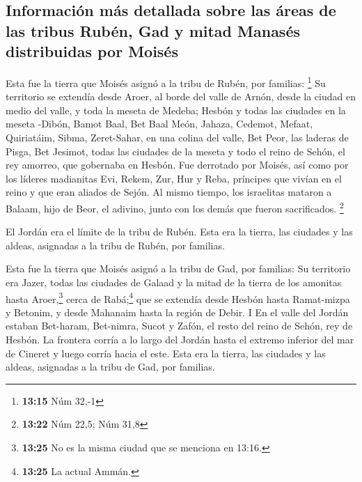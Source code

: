 \hypertarget{informaciuxf3n-muxe1s-detallada-sobre-las-uxe1reas-de-las-tribus-rubuxe9n-gad-y-mitad-manasuxe9s-distribuidas-por-moisuxe9s}{%
\subsection{Información más detallada sobre las áreas de las tribus
Rubén, Gad y mitad Manasés distribuidas por
Moisés}\label{informaciuxf3n-muxe1s-detallada-sobre-las-uxe1reas-de-las-tribus-rubuxe9n-gad-y-mitad-manasuxe9s-distribuidas-por-moisuxe9s}}

 Esta fue la tierra que Moisés asignó a la tribu de
Rubén, por familias: \footnote{\textbf{13:15} Núm 32,-1} 
Su territorio se extendía desde Aroer, al borde del valle de Arnón,
desde la ciudad en medio del valle, y toda la meseta de Medeba;
 Hesbón y todas las ciudades en la meseta -Dibón, Bamot
Baal, Bet Baal Meón,  Jahaza, Cedemot, Mefaat,
 Quiriatáim, Sibma, Zeret-Sahar, en una colina del valle,
 Bet Peor, las laderas de Pisga, Bet Jesimot,
 todas las ciudades de la meseta y todo el reino de
Sehón, el rey amorreo, que gobernaba en Hesbón. Fue derrotado por
Moisés, así como por los líderes madianitas Evi, Rekem, Zur, Hur y Reba,
príncipes que vivían en el reino y que eran aliados de Sejón.
 Al mismo tiempo, los israelitas mataron a Balaam, hijo
de Beor, el adivino, junto con los demás que fueron sacrificados.
\footnote{\textbf{13:22} Núm 22,5; Núm 31,8}

 El Jordán era el límite de la tribu de Rubén. Esta era
la tierra, las ciudades y las aldeas, asignadas a la tribu de Rubén, por
familias.

 Esta fue la tierra que Moisés asignó a la tribu de Gad,
por familias:  Su territorio era Jazer, todas las
ciudades de Galaad y la mitad de la tierra de los amonitas hasta
Aroer,\footnote{\textbf{13:25} No es la misma ciudad que se menciona en
  13:16.} cerca de Rabá;\footnote{\textbf{13:25} La actual Ammán.}
 que se extendía desde Hesbón hasta Ramat-mizpa y
Betonim, y desde Mahanaim hasta la región de Debir.  I En
el valle del Jordán estaban Bet-haram, Bet-nimra, Sucot y Zafón, el
resto del reino de Sehón, rey de Hesbón. La frontera corría a lo largo
del Jordán hasta el extremo inferior del mar de Cineret y luego corría
hacia el este.  Esta era la tierra, las ciudades y las
aldeas, asignadas a la tribu de Gad, por familias.


